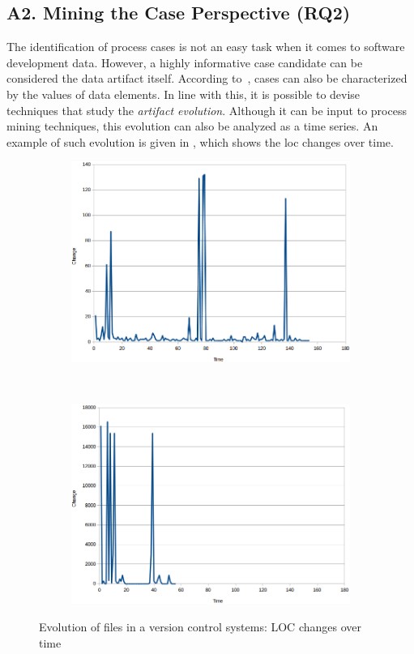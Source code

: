 \documentclass[a4paper,11pt]{article}
\begin{document}
\subsection{A2. Mining the Case Perspective (RQ2)}

The identification of process cases is not an easy task when it comes to software development data. However, a highly informative case candidate can be considered the data artifact itself. According to~\cite{VanderAalst2016b}, cases can also be characterized by the values of data elements. In line with this, it is possible to devise techniques that study the \emph{artifact evolution}. Although it can be input to process mining techniques, this evolution can also be analyzed as a time series. An example of such evolution is given in , which shows the \gls{loc} changes over time.

\begin{figure}[h]
	\centering
	\begin{subfigure}[b]{.4\textwidth}
		\includegraphics[width=\linewidth]{figures/time-series1}
	\end{subfigure}~
	\begin{subfigure}[b]{.4\textwidth}
		\includegraphics[width=\linewidth]{figures/time-series2}
	\end{subfigure}	
	\caption{Evolution of files in a version control systems: LOC changes over time}
	\label{fig:time-series1}
\end{figure}
\end{document}

